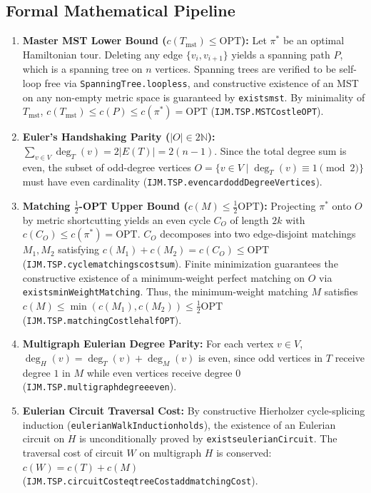 \documentclass[11pt,a4paper]{article}
\renewcommand{\_}{\origunderscore\allowbreak}
\theoremstyle{plain}
\theoremstyle{definition}
\theoremstyle{remark}
\begin{document}
\subsection{Formal Mathematical Pipeline}
\begin{enumerate}
  \item \textbf{Master MST Lower Bound ($c(T_{\text{mst}}) \le \mathrm{OPT}$):} Let $\pi^*$ be an optimal Hamiltonian tour. Deleting any edge $\{v_i, v_{i+1}\}$ yields a spanning path $P$, which is a spanning tree on $n$ vertices. Spanning trees are verified to be self-loop free via \texttt{SpanningTree.loopless}, and constructive existence of an MST on any non-empty metric space is guaranteed by \texttt{exists\_mst}. By minimality of $T_{\text{mst}}$, $c(T_{\text{mst}}) \le c(P) \le c(\pi^*) = \mathrm{OPT}$ (\texttt{IJM.TSP.MSTCost\_le\_OPT}).
  \item \textbf{Euler's Handshaking Parity ($|O| \in 2\mathbb{N}$):} $\sum_{v \in V} \deg_T(v) = 2|E(T)| = 2(n-1)$. Since the total degree sum is even, the subset of odd-degree vertices $O = \{v \in V \mid \deg_T(v) \equiv 1 \pmod 2\}$ must have even cardinality (\texttt{IJM.TSP.even\_card\_oddDegreeVertices}).
  \item \textbf{Matching $\frac{1}{2}$-OPT Upper Bound ($c(M) \le \frac{1}{2}\mathrm{OPT}$):} Projecting $\pi^*$ onto $O$ by metric shortcutting yields an even cycle $C_O$ of length $2k$ with $c(C_O) \le c(\pi^*) = \mathrm{OPT}$. $C_O$ decomposes into two edge-disjoint matchings $M_1, M_2$ satisfying $c(M_1) + c(M_2) = c(C_O) \le \mathrm{OPT}$ (\texttt{IJM.TSP.cycle\_matchings\_cost\_sum}). Finite minimization guarantees the constructive existence of a minimum-weight perfect matching on $O$ via \texttt{exists\_min\allowbreak Weight\allowbreak Matching}. Thus, the minimum-weight matching $M$ satisfies $c(M) \le \min(c(M_1), c(M_2)) \le \frac{1}{2}\mathrm{OPT}$ (\texttt{IJM.TSP.matchingCost\_le\_half\_OPT}).
  \item \textbf{Multigraph Eulerian Degree Parity:} For each vertex $v \in V$, $\deg_H(v) = \deg_T(v) + \deg_M(v)$ is even, since odd vertices in $T$ receive degree $1$ in $M$ while even vertices receive degree $0$ (\texttt{IJM.TSP.multigraph\_degree\_even}).
  \item \textbf{Eulerian Circuit Traversal Cost:} By constructive Hierholzer cycle-splicing induction (\texttt{eulerianWalkInduction\_holds}), the existence of an Eulerian circuit on $H$ is unconditionally proved by \texttt{exists\_eulerian\allowbreak Circuit}. The traversal cost of circuit $W$ on multigraph $H$ is conserved: $c(W) = c(T) + c(M)$ (\texttt{IJM.TSP.circuitCost\_eq\_treeCost\_add\_matchingCost}).

\end{enumerate}
\end{document}
